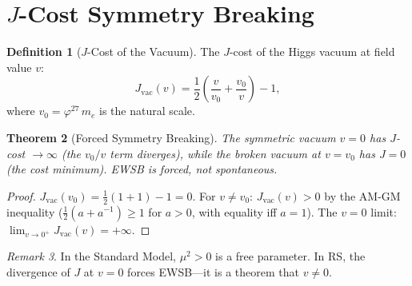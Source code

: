 \documentclass[12pt,a4paper]{article}
\newtheorem{theorem}{Theorem}[section]
\theoremstyle{definition}
\newtheorem{definition}[theorem]{Definition}
\theoremstyle{remark}
\newtheorem{remark}[theorem]{Remark}
\begin{document}
\section{$J$-Cost Symmetry Breaking}
\label{sec:j-cost}

\begin{definition}[$J$-Cost of the Vacuum]
The $J$-cost of the Higgs vacuum at field value $v$:
\begin{equation}
  J_{\mathrm{vac}}(v) = \frac{1}{2}\!\left(
  \frac{v}{v_0} + \frac{v_0}{v}\right) - 1,
\end{equation}
where $v_0 = \varphi^{27}\,m_e$ is the natural scale.
\end{definition}

\begin{theorem}[Forced Symmetry Breaking]
\label{thm:forced}
The symmetric vacuum $v = 0$ has $J$-cost $\to \infty$
(the $v_0/v$ term diverges), while the broken vacuum at
$v = v_0$ has $J = 0$ (the cost minimum).  EWSB is forced,
not spontaneous.
\end{theorem}

\begin{proof}
$J_{\mathrm{vac}}(v_0) = \tfrac{1}{2}(1 + 1) - 1 = 0$.
For $v \neq v_0$: $J_{\mathrm{vac}}(v) > 0$ by the AM-GM
inequality ($\tfrac{1}{2}(a + a^{-1}) \geq 1$ for $a > 0$,
with equality iff $a = 1$).  The $v = 0$ limit:
$\lim_{v \to 0^+} J_{\mathrm{vac}}(v) = +\infty$.
\end{proof}

\begin{remark}
In the Standard Model, $\mu^2 > 0$ is a free parameter.  In RS,
the divergence of $J$ at $v = 0$ forces EWSB---it is a theorem
that $v \neq 0$.
\end{remark}
\end{document}
